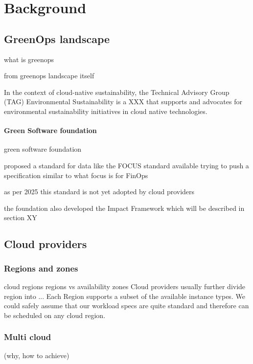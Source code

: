 \chapter{Background}
\label{cha:background}

\section{GreenOps landscape}

what is greenops

from greenops landscape itself

In the context of cloud-native sustainability,
the Technical Advisory Group (TAG) Environmental Sustainability is a XXX that supports and advocates for environmental sustainability initiatives in cloud native technologies.



\subsubsection{Green Software foundation}

green software foundation

proposed a standard for data like the FOCUS standard available 
trying to push a specification similar to what focus is for FinOps

as per 2025 this standard is not yet adopted by cloud providers

the foundation also developed the Impact Framework which will be described in section XY

\section{Cloud providers}

\subsection{Regions and zones}
cloud regions
regions vs availability zones
Cloud providers usually further divide region into ...
Each Region supports a subset of the available instance types.
We could safely assume that our workload specs are quite standard and therefore can be scheduled on any cloud region.


\subsection{Multi cloud}
(why, how to achieve)

